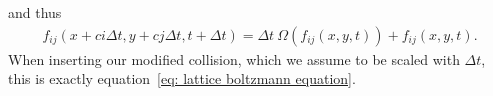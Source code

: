 and thus
\begin{equation}
  \label{eq: app_lbm_7}
  \begin{aligned}
    f_{ij}\left(x + ci\Delta t, y+ cj\Delta t, t+\Delta t\right)
    = \Delta t\ \Omega\left(f_{ij}(x,y,t)\right) + f_{ij}(x,y, t).
  \end{aligned}
\end{equation}
When inserting our modified collision, which we assume to be scaled with $\Delta t$, this is exactly equation~\eqref{eq: lattice boltzmann equation}.
